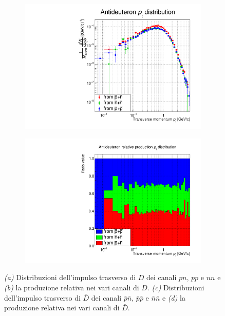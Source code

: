 \begin{figure}[htbp]
\begin{subfigure}{.49\textwidth}
        \caption{}
        \label{fig:A_ov_stack_deut}
    \end{subfigure}
    \begin{subfigure}{.49\textwidth}
    \centering
        \includegraphics[width=\textwidth]{image/3-risultati/antideuteron_analyse/A/ov_log.pdf}
        \caption{}
        \label{fig:A_ov_antideut}
    \end{subfigure}
    \begin{subfigure}{.49\textwidth}
        \centering
        \includegraphics[width=\textwidth]{image/3-risultati/antideuteron_analyse/A/ov_stack.pdf}
        \caption{}
        \label{fig:A_ov_stack_antideut}
    \end{subfigure}
    \caption{\emph{\rmfamily (a)} Distribuzioni dell'impulso trasverso di $D$ dei canali $pn$, $pp$ e $nn$ e \emph{\rmfamily (b)} la produzione relativa nei vari canali di $D$. \emph{\rmfamily (c)} Distribuzioni dell'impulso trasverso di $\bar D$ dei canali $\bar p\bar n$, $\bar p\bar p$ e $\bar n\bar n$ e \emph{\rmfamily (d)} la produzione relativa nei vari canali di $\bar D$.}
    \label{fig:A_ov}
\end{figure}
